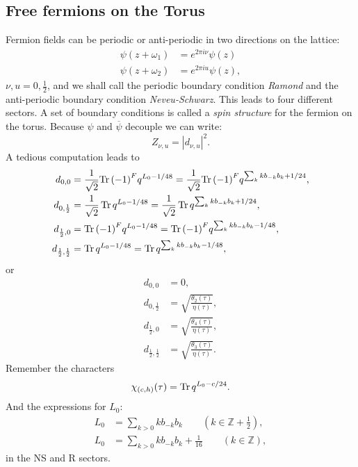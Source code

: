 \documentclass[submission, PhysLectNotes]{SciPost}
\begin{document}
\subsection{Free fermions on the Torus}
Fermion fields can be periodic or anti-periodic in two directions on the lattice:
\begin{align}
	\psi(z+\omega_1) &= e^{2\pi i \nu}\psi(z)\\
	\psi(z+\omega_2) &= e^{2\pi i u}\psi(z),
\end{align}
$\nu, u =0, \frac{1}{2}$, and we shall call the periodic boundary condition \emph{Ramond} and the anti-periodic boundary condition \emph{Neveu-Schwarz}. This leads to four different sectors. A set of boundary conditions is called a \emph{spin structure} for the fermion on the torus. Because $\psi$ and $\overline\psi$ decouple we can write:
\begin{equation}
	Z_{\nu, u} = |d_{\nu, u}|^2.
\end{equation}
A tedious computation leads to
\begin{align}
	d_{0,0} &= \frac{1}{\sqrt{2}} {\Tr}\, {\left(-1\right)}^F q^{L_0 - 1/48} = \frac{1}{\sqrt{2}} {\Tr}\, {(-1)}^F q^{\sum_k kb_{-k}b_k+1/24},\\
	d_{0,\frac{1}{2}} &= \frac{1}{\sqrt{2}}\Tr  q^{L_0 - 1/48} = \frac{1}{\sqrt{2}}\Tr q^{\sum_k kb_{-k}b_k+1/24},\\
	d_{\frac{1}{2},0} &= {\Tr}\, {(-1)}^F q^{L_0 - 1/48} = {\Tr}\, {(-1)}^F q^{\sum_k kb_{-k}b_k-1/48},\\
	d_{\frac{1}{2},\frac{1}{2}} &= \Tr q^{L_0 - 1/48} = \Tr q^{\sum_k k b_{-k}b_k-1/48},
\end{align}
or
\begin{align}
	d_{0,0} &= 0,\\
	d_{0,\frac{1}{2}} &= \sqrt{\frac{\theta_2(\tau)}{\eta(\tau)}},\\
	d_{\frac{1}{2},0} &= \sqrt{\frac{\theta_4(\tau)}{\eta(\tau)}},\\
	d_{\frac{1}{2},\frac{1}{2}} &= \sqrt{\frac{\theta_3(\tau)}{\eta(\tau)}}.
\end{align}
Remember the characters
\begin{equation}
	\chi_{(c,h)}(\tau) = \Tr q^{L_0 -c/24}.
\end{equation}
And the expressions for $L_0$:
\begin{align}
	L_0 &= \sum_{k>0} kb_{-k}b_k\qquad \left(k\in\mathbb{Z}+\frac{1}{2}\right),\\
	L_0 &= \sum_{k>0} kb_{-k}b_k + \frac{1}{16}\qquad \left(k\in\mathbb{Z}
	\right),
\end{align}
in the NS and R sectors.
\end{document}
